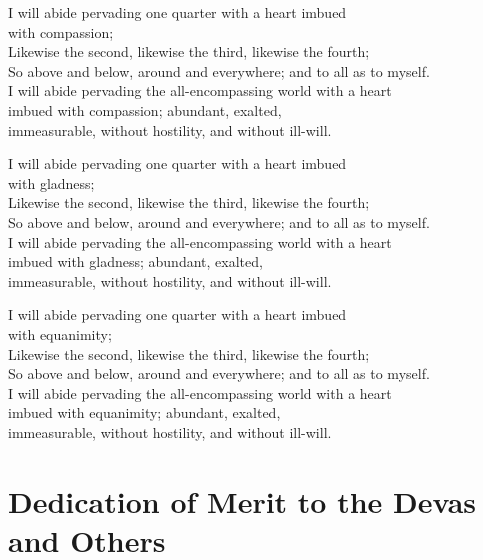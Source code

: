 I will abide pervading one quarter with a heart imbued\\
\vin with compassion;\\
Likewise the second, likewise the third, likewise the fourth;\\
So above and below, around and everywhere; and to all as to myself.\\
I will abide pervading the all-encompassing world with a heart \\
\vin imbued with compassion; abundant, exalted,\\
\vin immeasurable, without hostility, and without ill-will.

I will abide pervading one quarter with a heart imbued\\
\vin with gladness;\\
Likewise the second, likewise the third, likewise the fourth;\\
So above and below, around and everywhere; and to all as to myself.\\
I will abide pervading the all-encompassing world with a heart \\
\vin imbued with gladness; abundant, exalted,\\
\vin immeasurable, without hostility, and without ill-will.

I will abide pervading one quarter with a heart imbued\\
\vin with equanimity;\\
Likewise the second, likewise the third, likewise the fourth;\\
So above and below, around and everywhere; and to all as to myself.\\
I will abide pervading the all-encompassing world with a heart \\
\vin imbued with equanimity; abundant, exalted,\\
\vin immeasurable, without hostility, and without ill-will.

\section{Dedication of Merit to the Devas and Others}



\begin{leader}
\end{leader}

